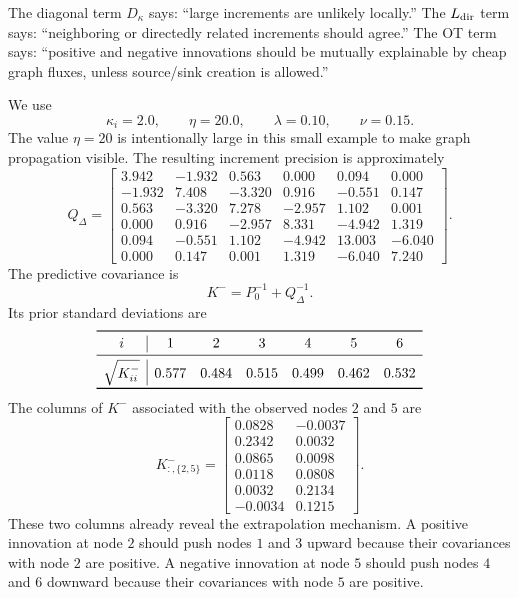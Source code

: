 \documentclass[11pt]{article}
\numberwithin{equation}{section}
\begin{document}
\begin{heuristicbox}
The diagonal term $D_\kappa$ says: ``large increments are unlikely locally.''  The $L_{\rm dir}$ term says: ``neighboring or directedly related increments should agree.''  The OT term says: ``positive and negative innovations should be mutually explainable by cheap graph fluxes, unless source/sink creation is allowed.''
\end{heuristicbox}

\begin{runningexample}
We use
\[
  \kappa_i=2.0,
  \qquad
  \eta=20.0,
  \qquad
  \lambda=0.10,
  \qquad
  \nu=0.15.
\]
The value $\eta=20$ is intentionally large in this small example to make graph propagation visible.  The resulting increment precision is approximately
\[
Q_\Delta=\begin{bmatrix}
 3.942&-1.932& 0.563& 0.000& 0.094& 0.000\\
-1.932& 7.408&-3.320& 0.916&-0.551& 0.147\\
 0.563&-3.320& 7.278&-2.957& 1.102& 0.001\\
 0.000& 0.916&-2.957& 8.331&-4.942& 1.319\\
 0.094&-0.551& 1.102&-4.942&13.003&-6.040\\
 0.000& 0.147& 0.001& 1.319&-6.040& 7.240
\end{bmatrix}.
\]
The predictive covariance is
\[
  K^-=P_0^{-1}+Q_\Delta^{-1}.
\]
Its prior standard deviations are
\[
\begin{array}{c|cccccc}
\toprule
 i&1&2&3&4&5&6\\
\midrule
 \sqrt{K^-_{ii}}&0.577&0.484&0.515&0.499&0.462&0.532\\
\bottomrule
\end{array}
\]
The columns of $K^-$ associated with the observed nodes $2$ and $5$ are
\[
K^-_{:,\{2,5\}}=
\begin{bmatrix}
 0.0828&-0.0037\\
 0.2342& 0.0032\\
 0.0865& 0.0098\\
 0.0118& 0.0808\\
 0.0032& 0.2134\\
-0.0034& 0.1215
\end{bmatrix}.
\]
These two columns already reveal the extrapolation mechanism.  A positive innovation at node $2$ should push nodes $1$ and $3$ upward because their covariances with node $2$ are positive.  A negative innovation at node $5$ should push nodes $4$ and $6$ downward because their covariances with node $5$ are positive.
\end{runningexample}
\end{document}
